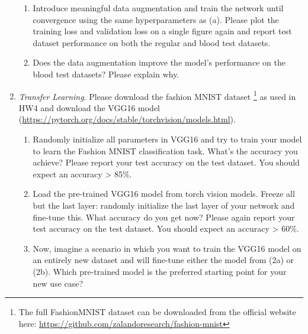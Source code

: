 \documentclass[a4paper]{article}
\begin{document}
\begin{enumerate}
\begin{enumerate}
			\item Introduce meaningful data augmentation and train the network until convergence using the same hyperparameters as (a). Please plot the training loss and validation loss on a single figure again and report test dataset performance on both the regular and blood test datasets.
			
			\item Does the data augmentation improve the model's performance on the blood test datasets? Please explain why.
            \end{enumerate}
	
		
		\item \textit{Transfer Learning}. Please download the fashion MNIST dataset \footnote{The full FashionMNIST dataset can be downloaded from the official website here: \url{https://github.com/zalandoresearch/fashion-mnist}} as used in HW4 and download the VGG16 model (\url{https://pytorch.org/docs/stable/torchvision/models.html}). 
		\begin{enumerate}
			\item Randomly initialize all parameters in VGG16 and try to train your model to learn the Fashion MNIST classification task. What's the accuracy you achieve? Please report your test accuracy on the test dataset. You should expect an accuracy > 85\%.
			
			\item Load the pre-trained VGG16 model from torch vision models. Freeze all but the last layer: randomly initialize the last layer of your network and fine-tune this. What accuracy do you get now? Please again report your test accuracy on the test dataset. You should expect an accuracy > 60\%.
			
			\item Now, imagine a scenario in which you want to train the VGG16 model on an entirely new dataset and will fine-tune either the model from (2a) or (2b). Which pre-trained model is the preferred starting point for your new use case?
			
		\end{enumerate} 
	\end{enumerate}
\end{document}
